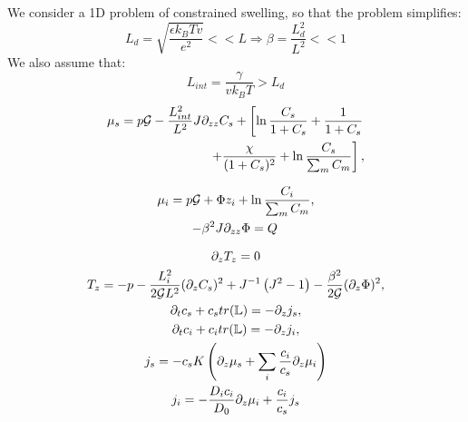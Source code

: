 We consider a 1D problem of constrained swelling, so that the problem simplifies:
\begin{equation}
L_d=\sqrt{\frac{\epsilon k_BTv}{e^2}}<<L \Rightarrow \beta=\frac{L^2_d}{L^2} <<1
\end{equation}
We also assume that:
\begin{equation}
L_{int} = \frac{\gamma}{vk_BT}>L_d
\end{equation}
\begin{gather}
\begin{aligned}
\mu_s = p \mathcal{G} - \frac{L^2_{int}}{L^2} J \partial_{zz} C_s + \left[\ln \frac{C_s}{1+C_s} + \frac{1}{1+C_s}\right.\\
\left.\ \ \ \ \ \ +\frac{\chi}{(1+C_s)^2} + \ln \frac{C_s}{\sum_m C_m} \right], 
\end{aligned}\\[2.5mm]
\mu_i = p \mathcal{G}+ \Phi z_i + \ln \frac{C_i}{\sum_m C_m} ,\\
-\beta^2 J \partial_{zz} \Phi = Q\, \\[2.5mm]
\partial_z T_z=0\\
T_z= -p - \frac{L^2_i}{2\mathcal{G}L^2} (\partial_z C_s)^2+ J^{-1}\left(J^2-1\right)-\frac{\beta^2}{2\mathcal{G}}(\partial_z \Phi)^2,\\
\partial_t c_s + c_s tr(\mathbb{L})=- \partial_z j_s,\\
\partial_t c_i + c_i tr(\mathbb{L})= -\partial_z j_i,\\
j_s =-c_sK  \left(\partial_z \mu_s +\sum_i \frac{c_i}{c_s} \partial_z \mu_i\right)\\
j_i= - \frac{D_ic_i}{D_0}\partial_z \mu_i + \frac{c_i}{c_s}j_s
\end{gather}

